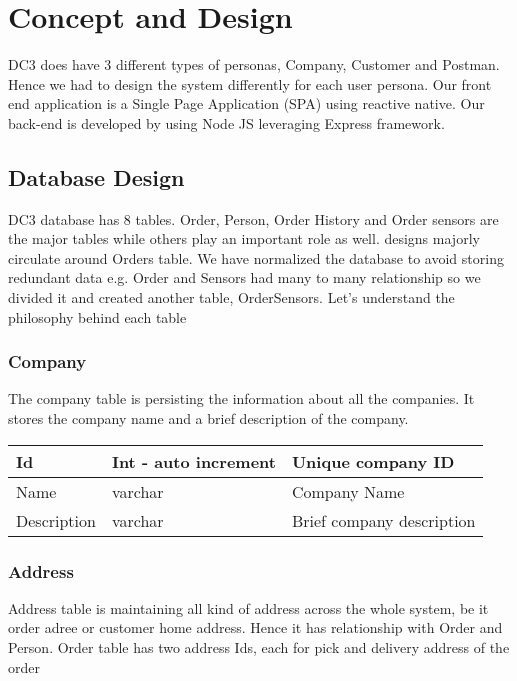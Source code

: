 \chapter{Concept and Design}
\label{cha:conceptanddesign}

DC3 does have 3 different types of personas, Company, Customer and Postman. Hence we had to design the system differently for each user persona. Our front end application is a Single Page Application (SPA) using reactive native. Our back-end is developed by using Node JS leveraging Express framework. 

\section{Database Design}
DC3 database has 8 tables. Order, Person, Order History and Order sensors are the major tables while others play an important role as well.  designs majorly circulate around Orders table. We have normalized the database to avoid storing redundant data e.g. Order and Sensors had many to many relationship so we divided it and created another table, OrderSensors. Let’s understand the philosophy behind each table


\subsection{Company}
The company table is persisting the information about all the companies. It stores the company name and a brief description of the company. 

\begin{center}
\begin{tabular}{ |l|l|l| } 
 \hline
Id & Int - auto increment & Unique company ID \\
 \hline
Name & varchar & Company Name \\
 \hline
Description & varchar & Brief company description \\
 \hline
\end{tabular}
\end{center}



\subsection{Address}
Address table is maintaining all kind of address across the whole system, be it order adree or customer home address. Hence it has relationship with Order and Person. Order table has two address Ids, each for pick and delivery address of the order

